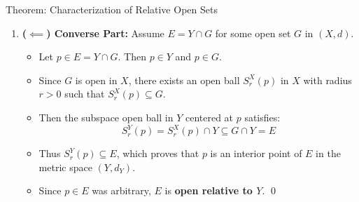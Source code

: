 \documentclass[11pt,a4paper]{article}
\begin{document}
\begin{exbox}{Theorem: Characterization of Relative Open Sets}
\begin{enumerate}
    \item \textbf{($\impliedby$) Converse Part:} Assume $E = Y \cap G$ for some open set $G$ in $(X, d)$.
    \begin{itemize}
        \item Let $p \in E = Y \cap G$. Then $p \in Y$ and $p \in G$.
        \item Since $G$ is open in $X$, there exists an open ball $S_r^X(p)$ in $X$ with radius $r > 0$ such that $S_r^X(p) \subseteq G$.
        \item Then the subspace open ball in $Y$ centered at $p$ satisfies:
        \begin{equation}
            S_r^Y(p) = S_r^X(p) \cap Y \subseteq G \cap Y = E
        \end{equation}
        \item Thus $S_r^Y(p) \subseteq E$, which proves that $p$ is an interior point of $E$ in the metric space $(Y, d_Y)$.
        \item Since $p \in E$ was arbitrary, $E$ is \textbf{open relative to $Y$}. \qed
    \end{itemize}
\end{enumerate}
\end{exbox}

\newpage
\end{document}
